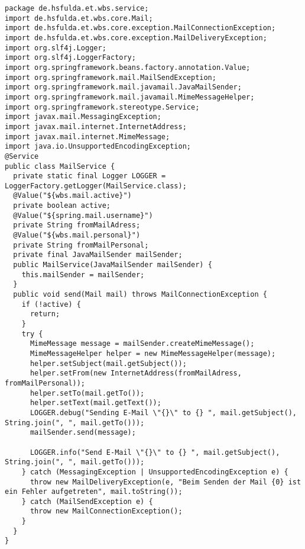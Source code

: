 \begin{lstlisting}[caption={Serviceklasse für das Versenden von E-Mails.}, label={lst:MailService}]
package de.hsfulda.et.wbs.service;
import de.hsfulda.et.wbs.core.Mail;
import de.hsfulda.et.wbs.core.exception.MailConnectionException;
import de.hsfulda.et.wbs.core.exception.MailDeliveryException;
import org.slf4j.Logger;
import org.slf4j.LoggerFactory;
import org.springframework.beans.factory.annotation.Value;
import org.springframework.mail.MailSendException;
import org.springframework.mail.javamail.JavaMailSender;
import org.springframework.mail.javamail.MimeMessageHelper;
import org.springframework.stereotype.Service;
import javax.mail.MessagingException;
import javax.mail.internet.InternetAddress;
import javax.mail.internet.MimeMessage;
import java.io.UnsupportedEncodingException;
@Service
public class MailService {
  private static final Logger LOGGER = LoggerFactory.getLogger(MailService.class);
  @Value("${wbs.mail.active}")
  private boolean active;
  @Value("${spring.mail.username}")
  private String fromMailAdress;
  @Value("${wbs.mail.personal}")
  private String fromMailPersonal;
  private final JavaMailSender mailSender;
  public MailService(JavaMailSender mailSender) {
    this.mailSender = mailSender;
  }
  public void send(Mail mail) throws MailConnectionException {
    if (!active) {
      return;
    }
    try {
      MimeMessage message = mailSender.createMimeMessage();
      MimeMessageHelper helper = new MimeMessageHelper(message);
      helper.setSubject(mail.getSubject());
      helper.setFrom(new InternetAddress(fromMailAdress, fromMailPersonal));
      helper.setTo(mail.getTo());
      helper.setText(mail.getText());
      LOGGER.debug("Sending E-Mail \"{}\" to {} ", mail.getSubject(), String.join(", ", mail.getTo()));
      mailSender.send(message);

      LOGGER.info("Send E-Mail \"{}\" to {} ", mail.getSubject(), String.join(", ", mail.getTo()));
    } catch (MessagingException | UnsupportedEncodingException e) {
      throw new MailDeliveryException(e, "Beim Senden der Mail {0} ist ein Fehler aufgetreten", mail.toString());
    } catch (MailSendException e) {
      throw new MailConnectionException();
    }
  }
}
\end{lstlisting}

